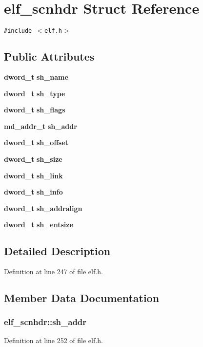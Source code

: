 \section{elf\_\-scnhdr Struct Reference}
\label{structelf__scnhdr}
{\tt \#include $<$elf.h$>$}

\subsection*{Public Attributes}
\begin{CompactItemize}
\item 
{\bf dword\_\-t} {\bf sh\_\-name}
\item 
{\bf dword\_\-t} {\bf sh\_\-type}
\item 
{\bf dword\_\-t} {\bf sh\_\-flags}
\item 
{\bf md\_\-addr\_\-t} {\bf sh\_\-addr}
\item 
{\bf dword\_\-t} {\bf sh\_\-offset}
\item 
{\bf dword\_\-t} {\bf sh\_\-size}
\item 
{\bf dword\_\-t} {\bf sh\_\-link}
\item 
{\bf dword\_\-t} {\bf sh\_\-info}
\item 
{\bf dword\_\-t} {\bf sh\_\-addralign}
\item 
{\bf dword\_\-t} {\bf sh\_\-entsize}
\end{CompactItemize}


\subsection{Detailed Description}


Definition at line 247 of file elf.h.

\subsection{Member Data Documentation}
\subsubsection[{sh\_\-addr}]{ {\bf elf\_\-scnhdr::sh\_\-addr}}\label{structelf__scnhdr_2328105004b3979ae7af804b06935b2a}




Definition at line 252 of file elf.h.
